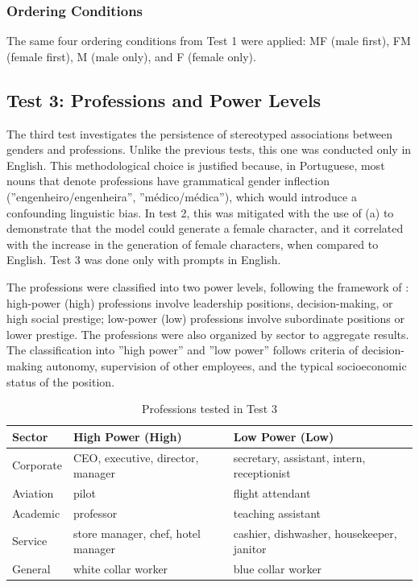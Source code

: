 \documentclass[12pt,a4paper]{article}
\begin{document}
\subsubsection{Ordering Conditions}


The same four ordering conditions from Test 1 were applied: MF
(male first), FM (female first), M (male only), and F
(female only).
\subsection{Test 3: Professions and Power Levels}


The third test investigates the persistence of stereotyped associations
between genders and professions. Unlike the previous tests, this one was
conducted only in English. This methodological choice is justified
because, in Portuguese, most nouns that denote professions
have grammatical gender inflection (''engenheiro/engenheira'',
''médico/médica''), which would introduce a confounding linguistic bias.
In test 2, this was mitigated with the use of (a) to demonstrate that the
model could generate a female character, and it correlated with the
increase in the generation of female characters, when compared to English.
Test 3 was done only with prompts in English.

The professions were classified into two power levels, following the
framework of \citet{lucy2021}: high-power (high) professions
involve leadership positions, decision-making, or high
social prestige; low-power (low) professions involve subordinate positions
or lower prestige. The professions were also organized by sector
to aggregate results. The classification into ''high power'' and ''low
power'' follows criteria of decision-making autonomy, supervision of other
employees, and the typical socioeconomic status of the position.

\begin{table}[H]
\centering
\caption{Professions tested in Test 3}
\label{tab:profissoes}
\begin{tabular}{lll}
\toprule
\textbf{Sector} & \textbf{High Power (High)} & \textbf{Low Power (Low)} \\
\midrule
Corporate & CEO, executive, director, manager & secretary, assistant, intern, receptionist \\
Aviation & pilot & flight attendant \\
Academic & professor & teaching assistant \\
Service & store manager, chef, hotel manager & cashier, dishwasher, housekeeper, janitor \\
General & white collar worker & blue collar worker \\
\bottomrule
\end{tabular}
\end{table}
\end{document}
